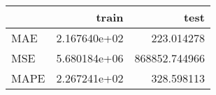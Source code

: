\begin{tabular}{lrr}
\toprule
{} &         train &           test \\
\midrule
MAE  &  2.167640e+02 &     223.014278 \\
MSE  &  5.680184e+06 &  868852.744966 \\
MAPE &  2.267241e+02 &     328.598113 \\
\bottomrule
\end{tabular}
